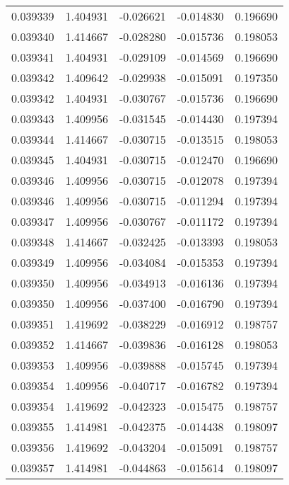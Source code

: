 \begin{tabular}{lrrrr}
0.039339    &  1.404931 & -0.026621 & -0.014830 &             0.196690 \\
0.039340    &  1.414667 & -0.028280 & -0.015736 &             0.198053 \\
0.039341    &  1.404931 & -0.029109 & -0.014569 &             0.196690 \\
0.039342    &  1.409642 & -0.029938 & -0.015091 &             0.197350 \\
0.039342    &  1.404931 & -0.030767 & -0.015736 &             0.196690 \\
0.039343    &  1.409956 & -0.031545 & -0.014430 &             0.197394 \\
0.039344    &  1.414667 & -0.030715 & -0.013515 &             0.198053 \\
0.039345    &  1.404931 & -0.030715 & -0.012470 &             0.196690 \\
0.039346    &  1.409956 & -0.030715 & -0.012078 &             0.197394 \\
0.039346    &  1.409956 & -0.030715 & -0.011294 &             0.197394 \\
0.039347    &  1.409956 & -0.030767 & -0.011172 &             0.197394 \\
0.039348    &  1.414667 & -0.032425 & -0.013393 &             0.198053 \\
0.039349    &  1.409956 & -0.034084 & -0.015353 &             0.197394 \\
0.039350    &  1.409956 & -0.034913 & -0.016136 &             0.197394 \\
0.039350    &  1.409956 & -0.037400 & -0.016790 &             0.197394 \\
0.039351    &  1.419692 & -0.038229 & -0.016912 &             0.198757 \\
0.039352    &  1.414667 & -0.039836 & -0.016128 &             0.198053 \\
0.039353    &  1.409956 & -0.039888 & -0.015745 &             0.197394 \\
0.039354    &  1.409956 & -0.040717 & -0.016782 &             0.197394 \\
0.039354    &  1.419692 & -0.042323 & -0.015475 &             0.198757 \\
0.039355    &  1.414981 & -0.042375 & -0.014438 &             0.198097 \\
0.039356    &  1.419692 & -0.043204 & -0.015091 &             0.198757 \\
0.039357    &  1.414981 & -0.044863 & -0.015614 &             0.198097 \\

\end{tabular}
